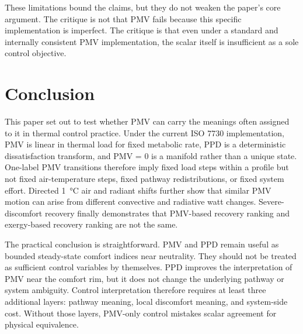 \documentclass[preprint,authoryear,12pt]{elsarticle}
\begin{document}
These limitations bound the claims, but they do not weaken the paper's core argument. The critique is not that PMV fails because this specific implementation is imperfect. The critique is that even under a standard and internally consistent PMV implementation, the scalar itself is insufficient as a sole control objective.

\section{Conclusion}

This paper set out to test whether PMV can carry the meanings often assigned to it in thermal control practice. Under the current ISO 7730 implementation, PMV is linear in thermal load for fixed metabolic rate, PPD is a deterministic dissatisfaction transform, and PMV = 0 is a manifold rather than a unique state. One-label PMV transitions therefore imply fixed load steps within a profile but not fixed air-temperature steps, fixed pathway redistributions, or fixed system effort. Directed \SI{1}{\celsius} air and radiant shifts further show that similar PMV motion can arise from different convective and radiative watt changes. Severe-discomfort recovery finally demonstrates that PMV-based recovery ranking and exergy-based recovery ranking are not the same.

The practical conclusion is straightforward. PMV and PPD remain useful as bounded steady-state comfort indices near neutrality. They should not be treated as sufficient control variables by themselves. PPD improves the interpretation of PMV near the comfort rim, but it does not change the underlying pathway or system ambiguity. Control interpretation therefore requires at least three additional layers: pathway meaning, local discomfort meaning, and system-side cost. Without those layers, PMV-only control mistakes scalar agreement for physical equivalence.



\end{document}
